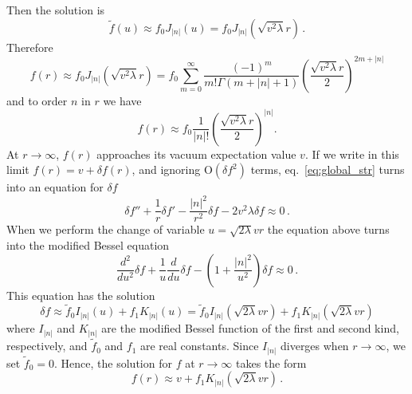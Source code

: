 Then the solution is
\begin{equation}
	\tilde f(u) \approx f_0 J_{|n|}(u) = f_0 J_{|n|}(\sqrt{v^2\lambda}r)\, .
\end{equation}
Therefore
\begin{equation}
	f(r) \approx f_0 J_{|n|}(\sqrt{v^2 \lambda}r) = f_0\sum_{m=0}^{\infty}\frac{(-1)^m}{m!\Gamma(m+|n|+1)}\left(\frac{\sqrt{v^2 \lambda}r}{2}\right)^{2m+|n|}
\end{equation}
and to order $n$ in $r$ we have
\begin{equation}
	f(r) \approx f_0 \frac{1}{|n|!}\left(\frac{\sqrt{v^2 \lambda}r}{2}\right)^{|n|}.
	\label{eq:solr0}
\end{equation}
At $r\to\infty$, $f(r)$ approaches its vacuum expectation value $v$. If we write in this limit $f(r) = v + \delta f(r)$, and ignoring O$(\delta f^2)$ terms, eq.\ \eqref{eq:global_str} turns into an equation for $\delta f$
\begin{equation}
	 \delta f'' +\frac{1}{r}\delta f'- \frac{|n|^2}{r^2}\delta f -2v^2\lambda\delta f \approx 0\, .
\end{equation}
When we perform the change of  variable $u=\sqrt{2\lambda}vr$ the equation above turns into the modified Bessel equation
\begin{equation}
\frac{d^2 }{du^2}\delta f + \frac{1}{u} \frac{d}{du}\delta f - \left(1+\frac{|n|^2}{u^2} \right)\delta f \approx 0\,.
\end{equation}
This equation has the solution
\begin{equation}
	\delta f \approx \tilde f_0I_{|n|}(u) + f_1 K_{|n|}(u) = \tilde f_0 I_{|n|}(\sqrt{2\lambda}vr) + f_1 K_{|n|}(\sqrt{2\lambda}vr)
\end{equation}
where $I_{|n|}$ and $K_{|n|}$ are the modified Bessel function of the first and second kind, respectively, and $\tilde f_0$ and $f_1$ are real constants. Since $I_{|n|}$ diverges when $r\to \infty$, we set $\tilde f_0=0$. Hence, the solution for $f$ at $r\to\infty$ takes the form
\begin{equation}
	f(r) \approx v+f_1 K_{|n|}(\sqrt{2\lambda}vr)\, .
\end{equation}

